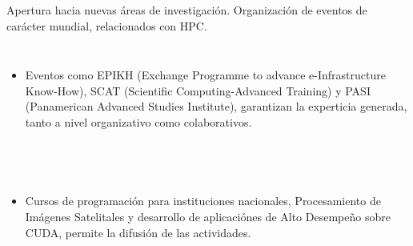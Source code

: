 \frame
{
\frametitle{}

Apertura hacia nuevas áreas de investigación. Organización de eventos de carácter mundial, relacionados con HPC.

\begin{columns}
\begin{itemize}
\item Eventos como EPIKH (Exchange Programme to advance e-Infrastructure Know-How), SCAT (Scientific Computing-Advanced Training) y PASI (Panamerican Advanced Studies Institute), garantizan 
la experticia generada, tanto a nivel organizativo como colaborativos. 
\end{itemize}
\end{columns}

}

\frame

\frametitle{}
{
\begin{columns}
\begin{itemize}
\item Cursos de programación para instituciones nacionales, Procesamiento de Imágenes Satelitales y desarrollo de aplicaciónes de Alto Desempeño sobre CUDA, permite la difusión de las actividades.
\end{itemize}
\end{columns}

}

